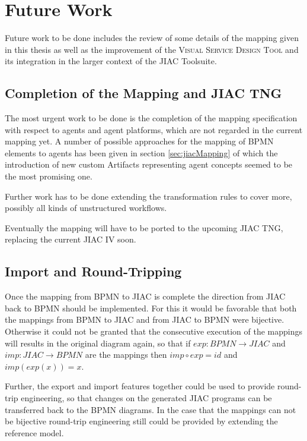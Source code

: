 \section{Future Work}

Future work to be done includes the review of some details of the mapping given in this thesis as well as the improvement of the \textsc{Visual Service Design Tool} and its integration in the larger context of the JIAC Toolsuite.


\subsection{Completion of the Mapping and JIAC TNG}

The most urgent work to be done is the completion of the mapping specification with respect to agents and agent platforms, which are not regarded in the current mapping yet. A number of possible approaches for the mapping of BPMN elements to agents has been given in section \ref{sec:jiacMapping} of which the introduction of new custom Artifacts representing agent concepts seemed to be the most promising one.

Further work has to be done extending the transformation rules to cover more, possibly all kinds of unstructured workflows.

Eventually the mapping will have to be ported to the upcoming JIAC TNG, replacing the current JIAC IV soon.


\subsection{Import and Round-Tripping}

Once the mapping from BPMN to JIAC is complete the direction from JIAC back to BPMN should be implemented. For this it would be favorable that both the mappings from BPMN to JIAC and from JIAC to BPMN were bijective. Otherwise it could not be granted that the consecutive execution of the mappings will results in the original diagram again, so that if $exp: BPMN \rightarrow JIAC$ and $imp:JIAC \rightarrow BPMN$ are the mappings then $imp \circ exp = id$ and $imp(exp(x))=x$.

Further, the export and import features together could be used to provide round-trip engineering, so that changes on the generated JIAC programs can be transferred back to the BPMN diagrams. In the case that the mappings can not be bijective round-trip engineering still could be provided by extending the reference model.


